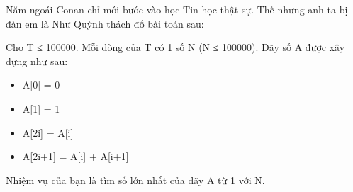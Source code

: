 Năm ngoái Conan chỉ mới bước vào học Tin học thật sự. Thế nhưng anh ta bị đàn em là Như Quỳnh thách đố bài toán sau:  

   Cho T ≤ 100000. Mỗi dòng của T có 1 số N (N ≤ 100000). Dãy số A được xây dựng như sau:  
\begin{itemize}
	\item     A[0]    = 0   
	\item     A[1]    = 1   
	\item     A[2i]   = A[i]   
	\item     A[2i+1] = A[i] + A[i+1]   
\end{itemize}

   Nhiệm vụ của bạn là tìm số lớn nhất của dãy A từ 1 với N.  

\